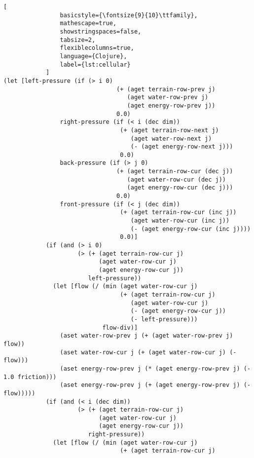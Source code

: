 \begin{lstlisting}[
                basicstyle={\fontsize{9}{10}\ttfamily},
                mathescape=true,
                showstringspaces=false,
                tabsize=2,
                flexiblecolumns=true,
                language={Clojure},
                label={lst:cellular}
            ]
(let [left-pressure (if (> i 0)
                                (+ (aget terrain-row-prev j)
                                   (aget water-row-prev j)
                                   (aget energy-row-prev j))
                                0.0)
                right-pressure (if (< i (dec dim))
                                 (+ (aget terrain-row-next j)
                                    (aget water-row-next j)
                                    (- (aget energy-row-next j)))
                                 0.0)
                back-pressure (if (> j 0)
                                (+ (aget terrain-row-cur (dec j))
                                   (aget water-row-cur (dec j))
                                   (aget energy-row-cur (dec j)))
                                0.0)
                front-pressure (if (< j (dec dim))
                                 (+ (aget terrain-row-cur (inc j))
                                    (aget water-row-cur (inc j))
                                    (- (aget energy-row-cur (inc j))))
                                 0.0)]
            (if (and (> i 0)
                     (> (+ (aget terrain-row-cur j)
                           (aget water-row-cur j)
                           (aget energy-row-cur j))
                        left-pressure))
              (let [flow (/ (min (aget water-row-cur j)
                                 (+ (aget terrain-row-cur j)
                                    (aget water-row-cur j)
                                    (- (aget energy-row-cur j))
                                    (- left-pressure)))
                            flow-div)]
                (aset water-row-prev j (+ (aget water-row-prev j) flow))
                (aset water-row-cur j (+ (aget water-row-cur j) (- flow)))
                (aset energy-row-prev j (* (aget energy-row-prev j) (- 1.0 friction)))
                (aset energy-row-prev j (+ (aget energy-row-prev j) (- flow)))))
            (if (and (< i (dec dim))
                     (> (+ (aget terrain-row-cur j)
                           (aget water-row-cur j)
                           (aget energy-row-cur j))
                        right-pressure))
              (let [flow (/ (min (aget water-row-cur j)
                                 (+ (aget terrain-row-cur j)

\end{lstlisting}
